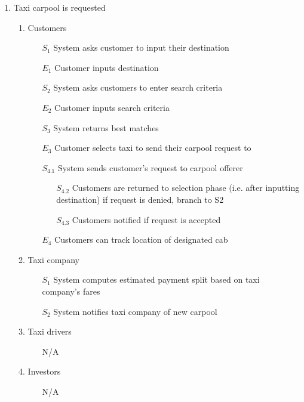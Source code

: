 \documentclass[]{article}
\begin{document}
\begin{enumerate}[{\textbf{BE}}1.]
    \item Taxi carpool is requested
    \begin{enumerate}[{\textbf{VP4}}.1]
        \item Customers
            \begin{enumerate}
                \item[$S_1$] System asks customer to input their destination
                \item[$E_1$] Customer inputs destination
	     \item[$S_2$] System asks customers to enter search criteria
	     \item[$E_2$] Customer inputs search criteria
 	     \item[$S_3$] System returns best matches
                \item[$E_3$] Customer selects taxi to send their carpool request to
\item[$S_{4.1}$] System sends customer's request to carpool offerer
                \begin{enumerate}
                    \item[$S_{4.2}$] Customers are returned to selection phase (i.e. after inputting destination) if request is denied, branch to S2
                    \item[$S_{4.3}$] Customers notified if request is accepted
                \end{enumerate}
                \item[$E_4$] Customers can track location of designated cab
            \end{enumerate}
        \item Taxi company
            \begin{enumerate}
                \item[$S_1$] System computes estimated payment split based on taxi company's fares
	        \item[$S_2$] System notifies taxi company of new carpool
            \end{enumerate}
        \item Taxi drivers
            \begin{enumerate}
                \item[N/A]
            \end{enumerate}
        \item Investors
            \begin{enumerate}
                \item[N/A]
            \end{enumerate}

\end{enumerate}
\end{enumerate}
\end{document}

